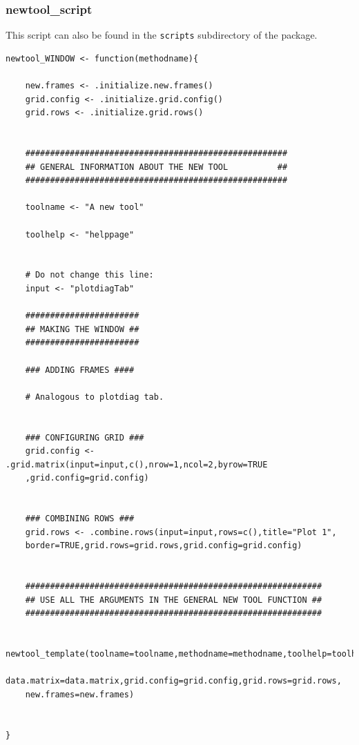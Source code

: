 \documentclass[a4paper]{article}\usepackage[]{graphicx}\usepackage[]{color}
\begin{document}
\subsubsection{newtool\_script}
\noindent This script can also be found in the \verb|scripts| subdirectory of the
package.
\begin{verbatim}
newtool_WINDOW <- function(methodname){  
	
	new.frames <- .initialize.new.frames()
	grid.config <- .initialize.grid.config()
	grid.rows <- .initialize.grid.rows()
	
	
	#####################################################
	## GENERAL INFORMATION ABOUT THE NEW TOOL		   ##
	#####################################################
		
	toolname <- "A new tool"
	
	toolhelp <- "helppage"
	
	
	# Do not change this line:
	input <- "plotdiagTab"
	
	#######################
	## MAKING THE WINDOW ##
	#######################
	
	### ADDING FRAMES ####
	
	# Analogous to plotdiag tab.
	
	
	### CONFIGURING GRID ###
	grid.config <- .grid.matrix(input=input,c(),nrow=1,ncol=2,byrow=TRUE
    ,grid.config=grid.config)
	
	
	### COMBINING ROWS ###
	grid.rows <- .combine.rows(input=input,rows=c(),title="Plot 1",
    border=TRUE,grid.rows=grid.rows,grid.config=grid.config)
	
	
	############################################################
	## USE ALL THE ARGUMENTS IN THE GENERAL NEW TOOL FUNCTION ##
	############################################################
	
	newtool_template(toolname=toolname,methodname=methodname,toolhelp=toolhelp,
    data.matrix=data.matrix,grid.config=grid.config,grid.rows=grid.rows,
    new.frames=new.frames)
	
	
}

\end{verbatim}
\end{document}
